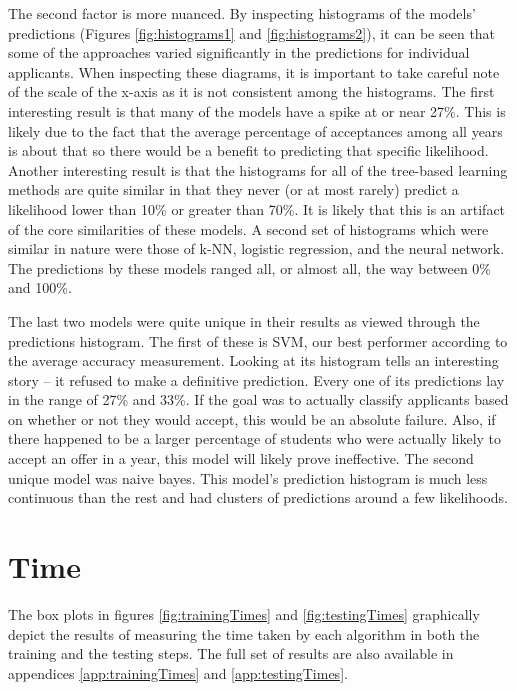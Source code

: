 The second factor is more nuanced. By inspecting histograms of the models' predictions (Figures \ref{fig:histograms1} and \ref{fig:histograms2}), it can be seen that some of the approaches varied significantly in the predictions for individual applicants. When inspecting these diagrams, it is important to take careful note of the scale of the x-axis as it is not consistent among the histograms. The first interesting result is that many of the models have a spike at or near 27\%. This is likely due to the fact that the average percentage of acceptances among all years is about that so there would be a benefit to predicting that specific likelihood. Another interesting result is that the histograms for all of the tree-based learning methods are quite similar in that they never (or at most rarely) predict a likelihood lower than 10\% or greater than 70\%. It is likely that this is an artifact of the core similarities of these models. A second set of histograms which were similar in nature were those of k-NN, logistic regression, and the neural network. The predictions by these models ranged all, or almost all, the way between 0\% and 100\%.

The last two models were quite unique in their results as viewed through the predictions histogram. The first of these is SVM, our best performer according to the average accuracy measurement. Looking at its histogram tells an interesting story -- it refused to make a definitive prediction. Every one of its predictions lay in the range of 27\% and 33\%. If the goal was to actually classify applicants based on whether or not they would accept, this would be an absolute failure. Also, if there happened to be a larger percentage of students who were actually likely to accept an offer in a year, this model will likely prove ineffective. The second unique model was naive bayes. This model's prediction histogram is much less continuous than the rest and had clusters of predictions around a few likelihoods.



\section{Time}
The box plots in figures \ref{fig:trainingTimes} and \ref{fig:testingTimes} graphically depict the results of measuring the time taken by each algorithm in both the training and the testing steps. The full set of results are also available in appendices \ref{app:trainingTimes} and \ref{app:testingTimes}.

